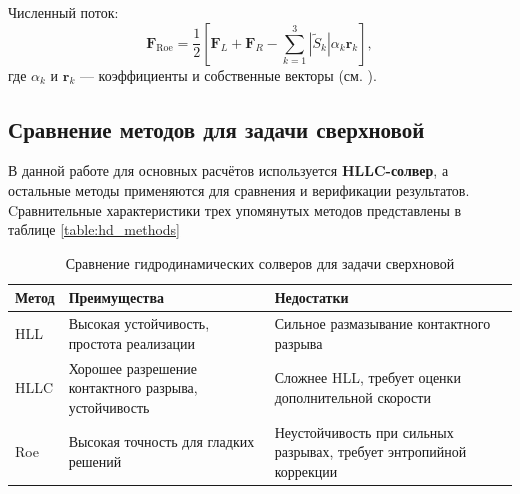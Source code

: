 \documentclass[a4paper,12pt]{extarticle}
\begin{document}
Численный поток:
\[
\mathbf{F}_{\text{Roe}} = \frac{1}{2} \left[ \mathbf{F}_L + \mathbf{F}_R - \sum_{k=1}^3 |\tilde{S}_k| \alpha_k \mathbf{r}_k \right],
\]
где $\alpha_k$ и $\mathbf{r}_k$ — коэффициенты и собственные векторы (см. \cite[Глава 10.4]{toro2009}).

\subsection{Сравнение методов для задачи сверхновой}

В данной работе для основных расчётов используется \textbf{HLLC-солвер}, а остальные методы применяются для сравнения и верификации результатов.
Cравнительные характеристики трех упомянутых методов представлены в таблице \ref{table:hd_methods}

\begin{table}[h] \label{table:hd_methods}
\centering
\caption{Сравнение гидродинамических солверов для задачи сверхновой}
\label{tab:solvers_comparison}
\begin{tabular}{p{}p{}p{}}
\toprule
\textbf{Метод} & \textbf{Преимущества} & \textbf{Недостатки} \\
\midrule
HLL & Высокая устойчивость, простота реализации & Сильное размазывание контактного разрыва \\
HLLC & Хорошее разрешение контактного разрыва, устойчивость & Сложнее HLL, требует оценки дополнительной скорости \\
Roe & Высокая точность для гладких решений & Неустойчивость при сильных разрывах, требует энтропийной коррекции \\
\bottomrule
\end{tabular}
\end{table}

\clearpage
\printbibliography
\end{document}
